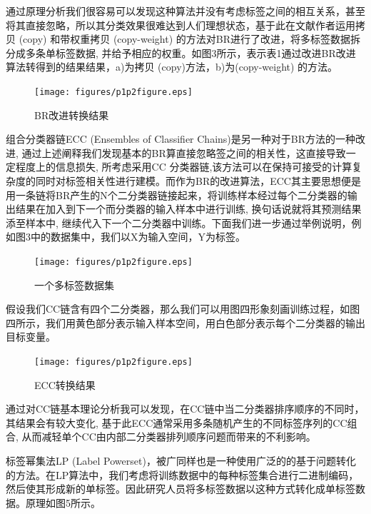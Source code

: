 通过原理分析我们很容易可以发现这种算法并没有考虑标签之间的相互关系，甚至将其直接忽略，所以其分类效果很难达到人们理想状态，基于此在文献\cite{Clare2002Knowledge}作者运用拷贝 (copy) 和带权重拷贝 (copy-weight) 的方法对BR进行了改进，将多标签数据拆分成多条单标签数据, 并给予相应的权重。如图3所示，表示表1通过改进BR改进算法转得到的结果结果，a)为拷贝 (copy)方法，b)为(copy-weight) 的方法。

\begin{figure}[htbp!]
	\centering
	\texttt{[image: figures/p1p2figure.eps]}
	\caption{BR改进转换结果}\label{fig:simuP1P2Result}
	\vspace{-1em}
\end{figure}

组合分类器链ECC (Ensembles of Classifier Chains)是另一种对于BR方法的一种改进, 通过上述阐释我们发现基本的BR算直接忽略签之间的相关性，这直接导致一定程度上的信息损失, 所考虑采用CC 分类器链,该方法可以在保持可接受的计算复杂度的同时对标签相关性进行建模。而作为BR的改进算法，ECC其主要思想便是用一条链将BR产生的N个二分类器链接起来，将训练样本经过每个二分类器的输出结果在加入到下一个而分类器的输入样本中进行训练, 换句话说就将其预测结果添至样本中, 继续代入下一个二分类器中训练。下面我们进一步通过举例说明，例如图3中的数据集中，我们以X为输入空间，Y为标签。

\begin{figure}[htbp!]
	\centering
	\texttt{[image: figures/p1p2figure.eps]}
	\caption{一个多标签数据集}\label{fig:simuP1P2Result}
	\vspace{-1em}
\end{figure}

假设我们CC链含有四个二分类器，那么我们可以用图四形象刻画训练过程，如图四所示，我们用黄色部分表示输入样本空间，用白色部分表示每个二分类器的输出目标变量。

\begin{figure}[htbp!]
	\centering
	\texttt{[image: figures/p1p2figure.eps]}
	\caption{ECC转换结果}\label{fig:simuP1P2Result}
	\vspace{-1em}
\end{figure}

通过对CC链基本理论分析我可以发现，在CC链中当二分类器排序顺序的不同时，其结果会有较大变化, 基于此ECC通常采用多条随机产生的不同标签序列的CC组合, 从而减轻单个CC由内部二分类器排列顺序问题而带来的不利影响。

标签幂集法LP (Label Powerset)，被广同样也是一种使用广泛的的基于问题转化的方法。在LP算法中，我们考虑将训练数据中的每种标签集合进行二进制编码，然后使其形成新的单标签。因此研究人员将多标签数据以这种方式转化成单标签数据。原理如图5所示。

